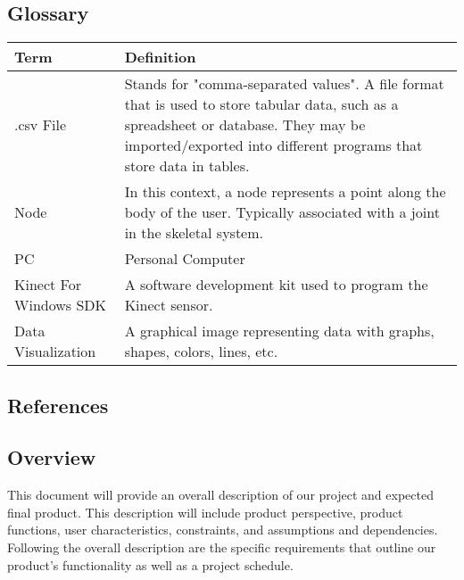\documentclass[onecolumn, draftclsnofoot,10pt, compsoc]{IEEEtran}
\begin{document}
\subsection{Glossary}
        \begin{tabu} to 
        \hline
        \textbf{Term} & \textbf{Definition}\\
        \hline
        .csv File & Stands for "comma-separated values". A file format that is used to store tabular data, such as a spreadsheet or database. They may be imported/exported into different programs that store data in tables\cite{csvFile}.\\
        \hline
        Node & In this context, a node represents a point along the body of the user. Typically associated with a joint in the skeletal system\cite{KinectDevelop}.\\
        \hline
        PC & Personal Computer\\
        \hline
        Kinect For Windows SDK & A software development kit used to program the Kinect sensor\cite{KinectDevelop}.\\
        \hline
        Data Visualization & A graphical image representing data with graphs, shapes, colors, lines, etc.\\
        \hline
\end{tabu}
\subsection{References}



\newpage
\subsection{Overview}
This document will provide an overall description of our project and expected final 
product. This description will include product perspective, product functions, user 
characteristics, constraints, and assumptions and dependencies. Following the overall 
description are the specific requirements that outline our product's functionality as 
well as a project schedule.
\end{document}
